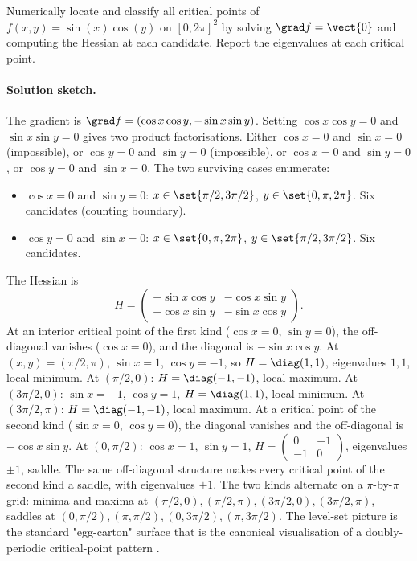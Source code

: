 \begin{exercise}
Numerically locate and classify all critical points of $f(x, y) =
\sin(x) \cos(y)$ on $[0, 2\pi]^{2}$ by solving $\grad f = \vect{0}$
and computing the Hessian at each candidate. Report the eigenvalues
at each critical point.

\paragraph{Solution sketch.} The gradient is $\grad f = (\cos x
\cos y, -\sin x \sin y)$. Setting $\cos x \cos y = 0$ and $\sin x
\sin y = 0$ gives two product factorisations. Either $\cos x = 0$
and $\sin x = 0$ (impossible), or $\cos y = 0$ and $\sin y = 0$
(impossible), or $\cos x = 0$ and $\sin y = 0$, or $\cos y = 0$ and
$\sin x = 0$. The two surviving cases enumerate:
\begin{itemize}[leftmargin=*]
  \item $\cos x = 0$ and $\sin y = 0$: $x \in \set{\pi/2, 3\pi/2}$,
    $y \in \set{0, \pi, 2\pi}$. Six candidates (counting boundary).
  \item $\cos y = 0$ and $\sin x = 0$: $x \in \set{0, \pi, 2\pi}$,
    $y \in \set{\pi/2, 3\pi/2}$. Six candidates.
\end{itemize}
The Hessian is
\[
H = \begin{pmatrix} -\sin x \cos y & -\cos x \sin y \\
-\cos x \sin y & -\sin x \cos y \end{pmatrix}.
\]
At an interior critical point of the first kind ($\cos x = 0$,
$\sin y = 0$), the off-diagonal vanishes ($\cos x = 0$), and the
diagonal is $-\sin x \cos y$. At $(x, y) = (\pi/2, \pi)$, $\sin x =
1$, $\cos y = -1$, so $H = \diag(1, 1)$, eigenvalues $1, 1$, local
minimum. At $(\pi/2, 0)$: $H = \diag(-1, -1)$, local maximum.
At $(3\pi/2, 0)$: $\sin x = -1$, $\cos y = 1$, $H = \diag(1, 1)$,
local minimum. At $(3\pi/2, \pi)$: $H = \diag(-1, -1)$, local
maximum. At a critical point of the second kind ($\sin x = 0$,
$\cos y = 0$), the diagonal vanishes and the off-diagonal is
$-\cos x \sin y$. At $(0, \pi/2)$: $\cos x = 1$, $\sin y = 1$,
$H = \begin{pmatrix} 0 & -1 \\ -1 & 0 \end{pmatrix}$, eigenvalues
$\pm 1$, saddle. The same off-diagonal structure makes every
critical point of the second kind a saddle, with eigenvalues $\pm
1$. The two kinds alternate on a $\pi$-by-$\pi$ grid: minima and
maxima at $(\pi/2, 0), (\pi/2, \pi), (3\pi/2, 0), (3\pi/2, \pi)$,
saddles at $(0, \pi/2), (\pi, \pi/2), (0, 3\pi/2), (\pi, 3\pi/2)$.
The level-set picture is the standard "egg-carton" surface that is
the canonical visualisation of a doubly-periodic critical-point
pattern \cite{text:v2ch11-marsden-tromba-2011}.
\end{exercise}

